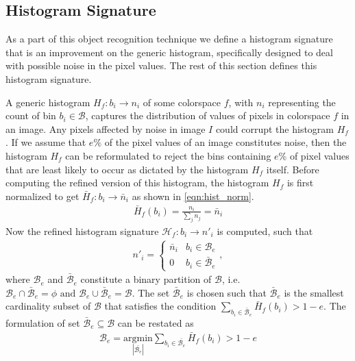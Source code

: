 \documentclass {udthesis}
\begin{document}
\subsection{Histogram Signature}
\label{sec:hist_signature}

As a part of this object recognition technique we define a histogram signature that is an improvement on the generic histogram, specifically designed to deal with possible noise in the pixel values. The rest of this section defines this histogram signature.

A generic histogram $H_f:b_i\to n_i$ of some colorspace $f$, with $n_i$ representing the count of bin $b_i \in \mathcal{B}$, captures the distribution of values of pixels in colorspace $f$ in an image. Any pixels affected by noise in image $I$ could corrupt the histogram $H_f$. If we assume that $e\%$ of the pixel values of an image constitutes noise, then the histogram $H_f$ can be reformulated to reject the bins containing $e\%$ of pixel values that are least likely to occur as dictated by the histogram $H_f$ itself. Before computing the refined version of this histogram, the histogram $H_f$ is first normalized to get $\bar{H}_f:b_i\to \bar{n}_i$ as shown in \eqref{eqn:hist_norm}.
%
\begin{align}	\label{eqn:hist_norm}
 \bar{H}_f(b_i)=\frac{n_i}{\sum_{j}n_j}=\bar{n}_i
\end{align}
Now the refined histogram signature $\mathcal{H}_f:b_i\to n'_i$ is computed, such that
\begin{align}
  n'_i = 
  \begin{cases}
     \bar{n}_i & b_i \in \mathcal{B}_e\\
     0	&	b_i \in \bar{\mathcal{B}}_e
  \end{cases},
\end{align}
%
where $\mathcal{B}_e$ and $\bar{\mathcal{B}}_e$ constitute a binary partition of $\mathcal{B}$, 
i.e. $\mathcal{B}_e \cap \bar{\mathcal{B}}_e = \phi \text{ and } 
\mathcal{B}_e \cup \bar{\mathcal{B}}_e = \mathcal{B}$. 
The set $\bar{\mathcal{B}}_e$ is chosen such that 
$\bar{\mathcal{B}}_e$ is the smallest cardinality subset of 
$\mathcal{B}$ that satisfies the condition $\sum_{b_i \in \bar{\mathcal{B}}_e} \bar{H}_f(b_i) > 1-e$. 
The formulation of set $\bar{\mathcal{B}}_e\subseteq\mathcal{B}$ can be restated as
\begin{align}
 \mathcal{{B}}_e=\underset{|\bar{\mathcal{B}_e}|} {\mathrm{argmin}} \sum_{b_i \in \bar{\mathcal{B}_e}} \bar{H}_f(b_i) > 1-e
\end{align}
\end{document}
